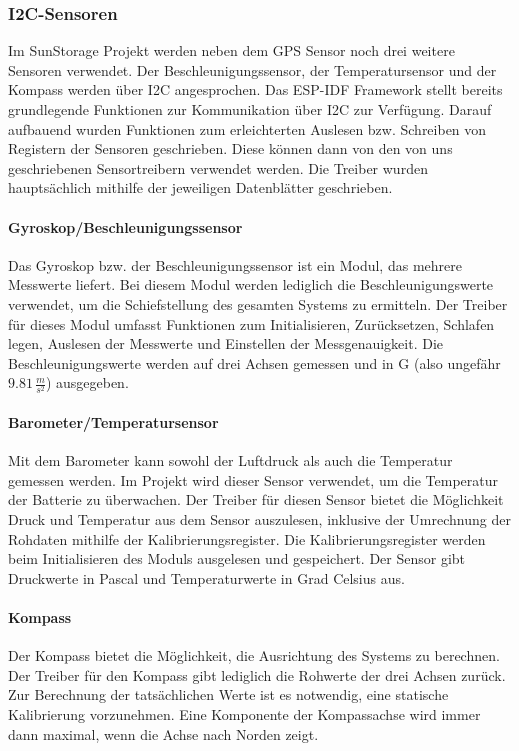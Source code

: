\subsubsection{I2C-Sensoren}
Im SunStorage Projekt werden neben dem GPS Sensor noch drei weitere Sensoren verwendet.
Der Beschleunigungssensor, der Temperatursensor und der Kompass werden über I2C angesprochen.
Das ESP-IDF Framework stellt bereits grundlegende Funktionen zur Kommunikation über I2C zur Verfügung.
Darauf aufbauend wurden Funktionen zum erleichterten Auslesen bzw. Schreiben von Registern der Sensoren geschrieben.
Diese können dann von den von uns geschriebenen Sensortreibern verwendet werden.
Die Treiber wurden hauptsächlich mithilfe der jeweiligen Datenblätter geschrieben.

\paragraph{Gyroskop/Beschleunigungssensor}
Das Gyroskop bzw. der Beschleunigungssensor ist ein Modul, das mehrere Messwerte liefert.
Bei diesem Modul werden lediglich die Beschleunigungswerte verwendet, um die Schiefstellung des gesamten Systems zu ermitteln.
Der Treiber für dieses Modul umfasst Funktionen zum Initialisieren, Zurücksetzen, Schlafen legen, Auslesen der Messwerte und Einstellen der Messgenauigkeit.
Die Beschleunigungswerte werden auf drei Achsen gemessen und in G (also ungefähr $9.81\,\frac{m}{s^2}$) ausgegeben.

\paragraph{Barometer/Temperatursensor}
Mit dem Barometer kann sowohl der Luftdruck als auch die Temperatur gemessen werden.
Im Projekt wird dieser Sensor verwendet, um die Temperatur der Batterie zu überwachen.
Der Treiber für diesen Sensor bietet die Möglichkeit Druck und Temperatur aus dem Sensor auszulesen, inklusive der Umrechnung der Rohdaten mithilfe der Kalibrierungsregister.
Die Kalibrierungsregister werden beim Initialisieren des Moduls ausgelesen und gespeichert.
Der Sensor gibt Druckwerte in Pascal und Temperaturwerte in Grad Celsius aus.

\paragraph{Kompass}
Der Kompass bietet die Möglichkeit, die Ausrichtung des Systems zu berechnen.
Der Treiber für den Kompass gibt lediglich die Rohwerte der drei Achsen zurück.
Zur Berechnung der tatsächlichen Werte ist es notwendig, eine statische Kalibrierung vorzunehmen.
Eine Komponente der Kompassachse wird immer dann maximal, wenn die Achse nach Norden zeigt.\\

